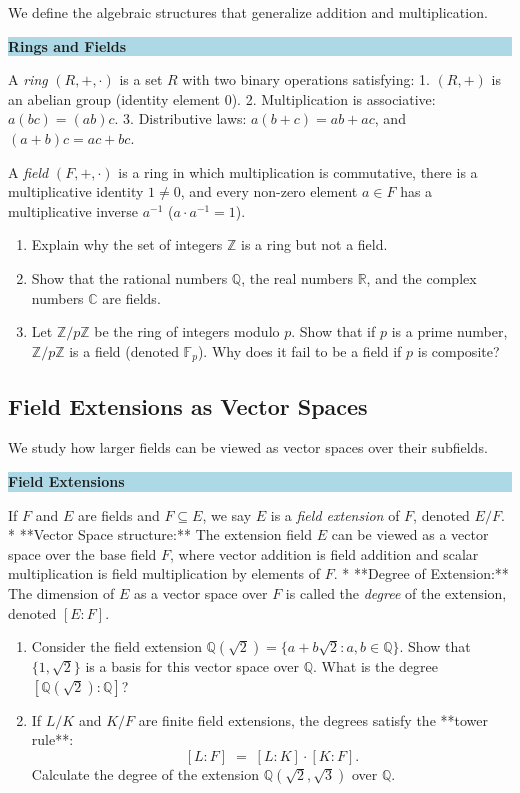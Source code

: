 \documentclass[12pt, a4paper]{article}
\newenvironment{namedconcept}[1]
  {\par\medskip\fillcolorbox{LightBlue}{NavyBlue}{#1}}
  {\par\medskip}
\newcommand{\fillcolorbox}[3]{%
  \noindent
  \filldrawbox{#1}{#2}{\textbf{\sffamily\color{white}#3}}\par\nobreak\vspace{4pt}
}
\newcommand{\filldrawbox}[3]{%
  \colorbox{#1}{\parbox{\dimexpr\linewidth-2\fboxsep\relax}{%
    \vspace{4pt}\noindent\hspace{4pt}#3\vspace{4pt}%
  }}%
}
\newcommand{\newterm}[1]{\textit{\textcolor{DiscoveryColor}{#1}}}
\begin{document}
We define the algebraic structures that generalize addition and multiplication.

\begin{namedconcept}{Rings and Fields}
A \newterm{ring} $(R, +, \cdot)$ is a set $R$ with two binary operations satisfying:
1. $(R, +)$ is an abelian group (identity element $0$).
2. Multiplication is associative: $a(bc) = (ab)c$.
3. Distributive laws: $a(b+c) = ab+ac$, and $(a+b)c = ac+bc$.

A \newterm{field} $(F, +, \cdot)$ is a ring in which multiplication is commutative, there is a multiplicative identity $1 \neq 0$, and every non-zero element $a \in F$ has a multiplicative inverse $a^{-1}$ ($a \cdot a^{-1} = 1$).
\end{namedconcept}

\begin{enumerate}[label=(\alph*), leftmargin=*]
  \item Explain why the set of integers $\mathbb{Z}$ is a ring but not a field.
  \item Show that the rational numbers $\mathbb{Q}$, the real numbers $\mathbb{R}$, and the complex numbers $\mathbb{C}$ are fields.
  \item Let $\mathbb{Z}/p\mathbb{Z}$ be the ring of integers modulo $p$. Show that if $p$ is a prime number, $\mathbb{Z}/p\mathbb{Z}$ is a field (denoted $\mathbb{F}_p$). Why does it fail to be a field if $p$ is composite?
\end{enumerate}

\subsection{Field Extensions as Vector Spaces}

We study how larger fields can be viewed as vector spaces over their subfields.

\begin{namedconcept}{Field Extensions}
If $F$ and $E$ are fields and $F \subseteq E$, we say $E$ is a \newterm{field extension} of $F$, denoted $E/F$.
* **Vector Space structure:** The extension field $E$ can be viewed as a vector space over the base field $F$, where vector addition is field addition and scalar multiplication is field multiplication by elements of $F$.
* **Degree of Extension:** The dimension of $E$ as a vector space over $F$ is called the \newterm{degree} of the extension, denoted $[E:F]$.
\end{namedconcept}

\begin{enumerate}[label=(\alph*), leftmargin=*]
  \item Consider the field extension $\mathbb{Q}(\sqrt{2}) = \{a + b\sqrt{2} : a, b \in \mathbb{Q}\}$.
        Show that $\{1, \sqrt{2}\}$ is a basis for this vector space over $\mathbb{Q}$. What is the degree $[\mathbb{Q}(\sqrt{2}):\mathbb{Q}]$?
  \item If $L/K$ and $K/F$ are finite field extensions, the degrees satisfy the **tower rule**:
  \[
    [L:F] \;=\; [L:K] \cdot [K:F].
  \]
  Calculate the degree of the extension $\mathbb{Q}(\sqrt{2}, \sqrt{3})$ over $\mathbb{Q}$.
\end{enumerate}
\end{document}
